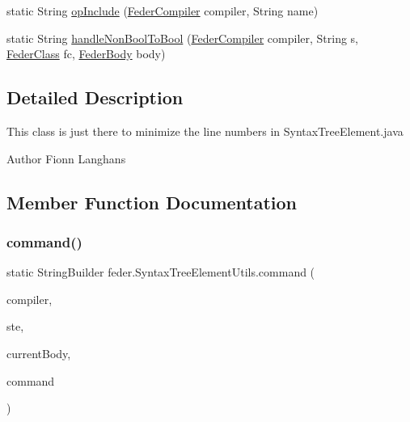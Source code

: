 \begin{DoxyCompactItemize}
\item 
static String \hyperlink{classfeder_1_1SyntaxTreeElementUtils_ad89f09ef8dc613cf8bc1fbbcac4cab0f}{op\+Include} (\hyperlink{classfeder_1_1FederCompiler}{Feder\+Compiler} compiler, String name)
\item 
static String \hyperlink{classfeder_1_1SyntaxTreeElementUtils_a5ab3b5907289b30822f67451d12fcd55}{handle\+Non\+Bool\+To\+Bool} (\hyperlink{classfeder_1_1FederCompiler}{Feder\+Compiler} compiler, String s, \hyperlink{classfeder_1_1types_1_1FederClass}{Feder\+Class} fc, \hyperlink{classfeder_1_1types_1_1FederBody}{Feder\+Body} body)
\end{DoxyCompactItemize}


\subsection{Detailed Description}
This class is just there to minimize the line numbers in Syntax\+Tree\+Element.\+java \begin{DoxyAuthor}{Author}
Fionn Langhans 
\end{DoxyAuthor}


\subsection{Member Function Documentation}
\mbox{\label{classfeder_1_1SyntaxTreeElementUtils_a7df6f6919bbef8d69def1af23b491fa3}} 
\subsubsection{\texorpdfstring{command()}{command()}}
{\footnotesize\ttfamily static String\+Builder feder.\+Syntax\+Tree\+Element\+Utils.\+command (\begin{DoxyParamCaption}\item[{\hyperlink{classfeder_1_1FederCompiler}{Feder\+Compiler}}]{compiler,  }\item[{\hyperlink{classfeder_1_1SyntaxTreeElement}{Syntax\+Tree\+Element}}]{ste,  }\item[{\hyperlink{classfeder_1_1types_1_1FederBody}{Feder\+Body}}]{current\+Body,  }\item[{String}]{command }\end{DoxyParamCaption})\hspace{0.3cm}{\ttfamily [static]}}

